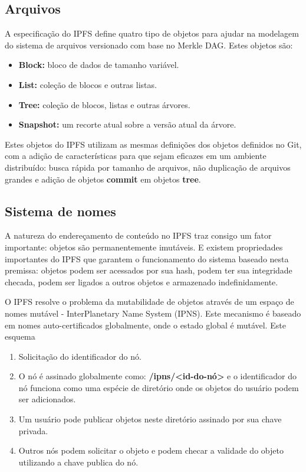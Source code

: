\documentclass[tcc,capa]{texufpel}
\begin{document}
        \subsection{Arquivos}
        
        A especificação do IPFS define quatro tipo de objetos para ajudar na modelagem do sistema de arquivos versionado com base no Merkle DAG. Estes objetos são:
        
        \begin{itemize}
            \item \textbf{Block:} bloco de dados de tamanho variável.
            \item \textbf{List:} coleção de blocos e outras listas.
            \item \textbf{Tree:} coleção de blocos, listas e outras árvores.
            \item \textbf{Snapshot:} um recorte atual sobre a versão atual da árvore.
        \end{itemize}
        
        Estes objetos do IPFS utilizam as mesmas definições dos objetos definidos no Git, com a adição de características para que sejam eficazes em um ambiente distribuído: busca rápida por tamanho de arquivos, não duplicação de arquivos grandes e adição de objetos \textbf{commit} em objetos \textbf{tree}. 
        
        \subsection{Sistema de nomes}
        
        A natureza do endereçamento de conteúdo no IPFS traz consigo um fator importante: objetos são permanentemente imutáveis. E existem propriedades importantes do IPFS que garantem o funcionamento do sistema baseado nesta premissa: objetos podem ser acessados por sua hash, podem ter sua integridade checada, podem ser ligados a outros objetos e armazenado indefinidamente.
        
        O IPFS resolve o problema da mutabilidade de objetos através de um espaço de nomes mutável - InterPlanetary Name System (IPNS). Este mecanismo é baseado em nomes auto-certificados globalmente, onde o estado global é mutável. Este esquema 
        
        \begin{enumerate}
            \item Solicitação do identificador do nó.
            \item O nó é assinado globalmente como: \textbf{/ipns/<id-do-nó>} e o identificador do nó funciona como uma espécie de diretório onde os objetos do usuário podem ser adicionados.
            \item Um usuário pode publicar objetos neste diretório assinado por sua chave privada.
            \item Outros nós podem solicitar o objeto e podem checar a validade do objeto utilizando a chave publica do nó.
        \end{enumerate}
        
\end{document}
